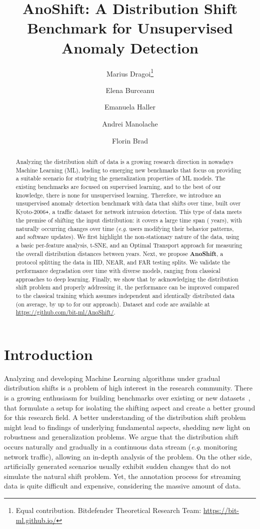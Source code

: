\documentclass{article}
\title{AnoShift: A Distribution Shift Benchmark for Unsupervised Anomaly Detection}
\author[,,1]{Marius Dragoi\thanks{Equal contribution. Bitdefender Theoretical Research Team: \url{https://bit-ml.github.io/}}}
\author[,,1,2]{Elena Burceanu\samethanks}
\author[,,1,3]{Emanuela Haller\samethanks}
\author[1]{Andrei Manolache}
\author[1]{Florin Brad}
\affil[1]{Bitdefender, Romania}
\affil[2]{University of Bucharest}
\affil[3]{Politehnica University of Bucharest}
\newcommand{\eg}{\textit{e}.\textit{g}. }
\begin{document}
\maketitle

\begin{abstract}
Analyzing the distribution shift of data is a growing research direction in nowadays Machine Learning (ML), leading to emerging new benchmarks that focus on providing a suitable scenario for studying the generalization properties of ML models. The existing benchmarks are focused on supervised learning, and to the best of our knowledge, there is none for unsupervised learning. Therefore, we introduce an unsupervised anomaly detection benchmark with data that shifts over time, built over Kyoto-2006\texttt{+}, a traffic dataset for network intrusion detection. This type of data meets the premise of shifting the input distribution: it covers a large time span ( years), with naturally occurring changes over time (\eg users modifying their behavior patterns, and software updates). We first highlight the non-stationary nature of the data, using a basic per-feature analysis, t-SNE, and an Optimal Transport approach for measuring the overall distribution distances between years. Next, we propose \textbf{AnoShift}, a protocol splitting the data in IID, NEAR, and FAR testing splits. We validate the performance degradation over time with diverse models, ranging from classical approaches to deep learning. Finally, we show that by acknowledging the distribution shift problem and properly addressing it, the performance can be improved compared to the classical training which assumes independent and identically distributed data (on average, by up to  for our approach). Dataset and code are available at \url{https://github.com/bit-ml/AnoShift/}.

\end{abstract}



\section{Introduction}

Analyzing and developing Machine Learning algorithms under gradual distribution shifts is a problem of high interest in the research community. 
There is a growing enthusiasm for building benchmarks over existing or new datasets~\cite{clear, mind_the_gap, shift_auto_drive, intel_cl_benck, wilds}, that formulate a setup for isolating the shifting aspect and create a better ground for this research field. A better understanding of the distribution shift problem might lead to findings of underlying fundamental aspects, shedding new light on robustness and generalization problems. We argue that the distribution shift occurs naturally and gradually in a continuous data stream (\eg monitoring network traffic), allowing an in-depth analysis of the problem. On the other side, artificially generated scenarios usually exhibit sudden changes that do not simulate the natural shift problem. Yet, the annotation process for streaming data is quite difficult and expensive, considering the massive amount of data. 
\end{document}
